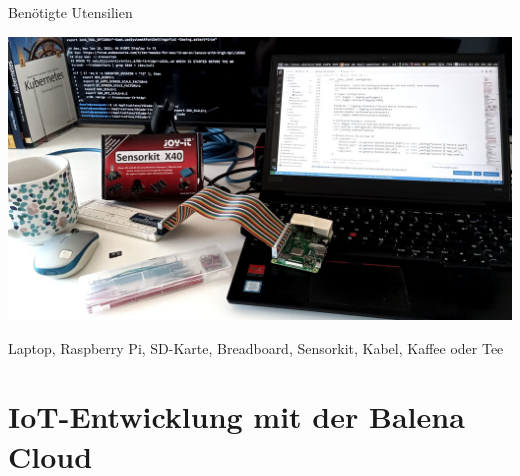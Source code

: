\begin{frame}{Benötigte Utensilien}
    \begin{center}
        \includegraphics[width=\textwidth]{06-architektur/img/utensilien}
    \end{center}

    \footnotesize
    Laptop, Raspberry Pi, SD-Karte, Breadboard, Sensorkit, Kabel, Kaffee oder Tee
\end{frame}

\section{IoT-Entwicklung mit der Balena Cloud}


